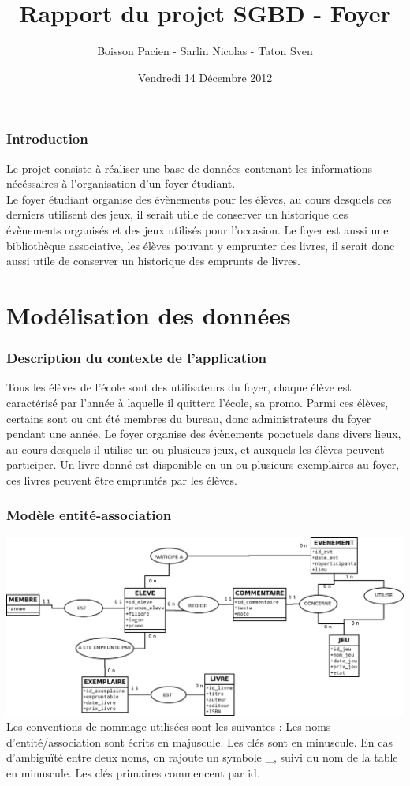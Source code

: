 \documentclass[a4paper, 11pt]{article}
\title{Rapport du projet SGBD - Foyer}
\author{Boisson Pacien - Sarlin Nicolas - Taton Sven}
\date{Vendredi 14 Décembre 2012}
\begin{document}
\maketitle
\tableofcontents
\newpage
\section{Introduction}
Le projet consiste à réaliser une base de données contenant les informations nécéssaires à l'organisation d'un foyer étudiant.\\
Le foyer étudiant organise des évènements pour les élèves, au cours desquels ces derniers utilisent des jeux, il serait utile de conserver un historique des évènements organisés et des jeux utilisés pour l'occasion. Le foyer est aussi une bibliothèque associative, les élèves pouvant y emprunter des livres, il serait donc aussi utile de conserver un historique des emprunts de livres.
\newpage
\part{Modélisation des données}
\setcounter{section}{0}
\section{Description du contexte de l'application}
Tous les élèves de l'école sont des utilisateurs du foyer, chaque élève est caractérisé par l'année à laquelle il quittera l'école, sa promo. Parmi ces élèves, certains sont ou ont été membres du bureau, donc administrateurs du foyer pendant une année. Le foyer organise des évènements ponctuels dans divers lieux, au cours desquels il utilise un ou plusieurs jeux, et auxquels les élèves peuvent participer. Un livre donné est disponible en un ou plusieurs exemplaires au foyer, ces livres peuvent être empruntés par les élèves.
\section{Modèle entité-association}
\includegraphics[width=1.2\textwidth]{ER.png}
Les conventions de nommage utilisées sont les suivantes : Les noms d'entité/association sont écrits en majuscule. Les clés sont en minuscule. En cas d'ambigu\"ité entre deux noms, on rajoute un symbole \_, suivi du nom de la table en minuscule. Les clés primaires commencent par id.
\end{document}
